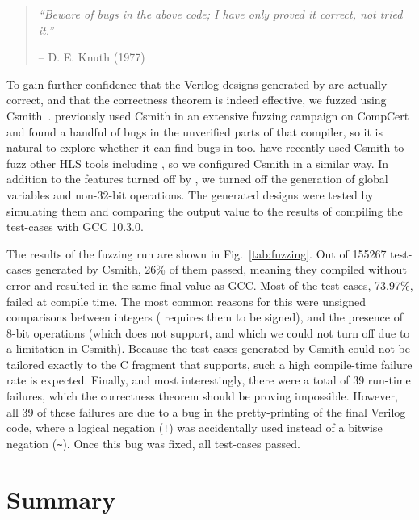\begin{quotation}
  \textit{\enquote{Beware of bugs in the above code; I have only proved it
      correct, not tried it.}}\par\hfill -- D. E. Knuth (1977)
\end{quotation}

\noindent To gain further confidence that the Verilog designs generated by
\vericert{} are actually correct, and that the correctness theorem is indeed
effective, we fuzzed \vericert{} using
Csmith~\cite{yang11_findin_under_bugs_c_compil}. \citeauthor{yang11_findin_under_bugs_c_compil}
previously used Csmith in an extensive fuzzing campaign on CompCert and found a
handful of bugs in the unverified parts of that compiler, so it is natural to
explore whether it can find bugs in \vericert{} too. \citet{herklotz21_esrhlst}
have recently used Csmith to fuzz other HLS tools including \legup{}, so we
configured Csmith in a similar way. In addition to the features turned off by
\citeauthor{herklotz21_esrhlst}, we turned off the generation of global
variables and non-32-bit operations. The generated designs were tested by
simulating them and comparing the output value to the results of compiling the
test-cases with GCC 10.3.0.

The results of the fuzzing run are shown in Fig.~\ref{tab:fuzzing}.  Out of
155267 test-cases generated by Csmith, 26\% of them passed, meaning they
compiled without error and resulted in the same final value as GCC. Most of the
test-cases, 73.97\%, failed at compile time.  The most common reasons for this
were unsigned comparisons between integers (\vericert{} requires them to be
signed), and the presence of 8-bit operations (which \vericert{} does not
support, and which we could not turn off due to a limitation in Csmith).
Because the test-cases generated by Csmith could not be tailored exactly to the
C fragment that \vericert{} supports, such a high compile-time failure rate is
expected. Finally, and most interestingly, there were a total of 39 run-time
failures, which the correctness theorem should be proving impossible.  However,
all 39 of these failures are due to a bug in the pretty-printing of the final
Verilog code, where a logical negation (\texttt{!}) was accidentally used
instead of a bitwise negation (\verb|~|).  Once this bug was fixed, all
test-cases passed.

\section{Summary}

